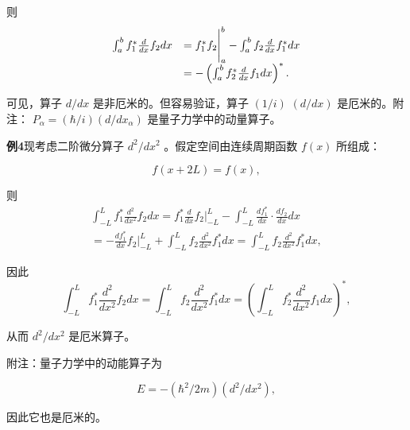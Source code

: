 则
\begin{equation*}
\begin{array}{r l} \int_ {a} ^ {b} f _ {1} ^ {*} \frac {d}{d x} f _ {2} d x & = f _ {1} ^ {*} f _ {2} \Bigg | _ {a} ^ {b} - \int_ {a} ^ {b} f _ {2} \frac {d}{d x} f _ {1} ^ {*} d x \\ & = - \left(\int_ {a} ^ {b} f _ {2} ^ {*} \frac {d}{d x} f _ {1} d x\right) ^ {*}. \end{array}
\end{equation*}

可见，算子 $d / dx$ 是非厄米的。但容易验证，算子 $(1 / i)$ $(d / dx)$ 是厄米的。附注： $P_{\alpha} = (\hbar /i)(d / dx_{\alpha})$ 是量子力学中的动量算子。

\textbf{例4}\quad 现考虑二阶微分算子 $d^2 / dx^2$ 。假定空间由连续周期函数 $f(x)$ 所组成：

\begin{equation*}
f (x + 2 L) = f (x),
\end{equation*}

则
\begin{equation*}
\begin{array}{l} \int_ {- L} ^ {L} f _ {1} ^ {*} \frac {d ^ {2}}{d x ^ {2}} f _ {2} d x = f _ {1} ^ {*} \frac {d}{d x} f _ {2} \Big | _ {- L} ^ {L} - \int_ {- L} ^ {L} \frac {d f _ {1} ^ {*}}{d x} \cdot \frac {d f _ {2}}{d x} d x \\ = - \frac {d f _ {1} ^ {*}}{d x} f _ {2} \Big | _ {- L} ^ {L} + \int_ {- L} ^ {L} f _ {2} \frac {d ^ {2}}{d x ^ {2}} f _ {1} ^ {*} d x = \int_ {- L} ^ {L} f _ {2} \frac {d ^ {2}}{d x ^ {2}} f _ {1} ^ {*} d x, \end{array}
\end{equation*}

因此
\begin{equation*}
\int_ {- L} ^ {L} f _ {1} ^ {*} \frac {d ^ {2}}{d x ^ {2}} f _ {2} d x = \int_ {- L} ^ {L} f _ {2} \frac {d ^ {2}}{d x ^ {2}} f _ {1} ^ {*} d x = \left(\int_ {- L} ^ {L} f _ {2} ^ {*} \frac {d ^ {2}}{d x ^ {2}} f _ {1} d x\right) ^ {*},
\end{equation*}

从而 $d^{2}/dx^{2}$ 是厄米算子。

附注：量子力学中的动能算子为

\begin{equation*}
E = - \left(\hbar^ {2} / 2 m\right) \left(d ^ {2} / d x ^ {2}\right),
\end{equation*}

因此它也是厄米的。

